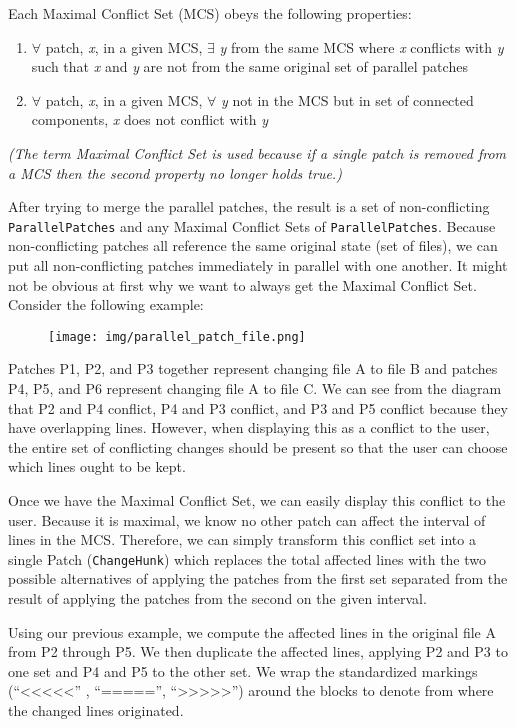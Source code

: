\documentclass[]{article}
\makeatletter
\def\maxwidth{\ifdim\Gin@nat@width>\linewidth\linewidth
\else\Gin@nat@width\fi}
\let\Oldincludegraphics\includegraphics
\renewcommand{\includegraphics}[1]{\Oldincludegraphics[width=\maxwidth]{#1}}
\makeatother
\begin{document}
Each Maximal Conflict Set (MCS) obeys the following properties: 
\begin{enumerate}[1.]
\item
$\forall$ patch, \emph{x}, in a given MCS, $\exists$ \emph{y} from the same
MCS where \emph{x} conflicts with \emph{y} such that \emph{x} and
\emph{y} are not from the same original set of parallel patches 
\item
$\forall$ patch, \emph{x}, in a given MCS, $\forall$ \emph{y} not in the MCS but in set
of connected components, \emph{x} does not conflict with \emph{y}
\end{enumerate}

\emph{(The term Maximal Conflict Set is used because if a single patch
is removed from a MCS then the second property no longer holds true.)}

After trying to merge the parallel patches, the result is a set of
non-conflicting \texttt{ParallelPatches} and any Maximal Conflict Sets
of \texttt{ParallelPatches}. Because non-conflicting patches all
reference the same original state (set of files), we can put all
non-conflicting patches immediately in parallel with one another. It
might not be obvious at first why we want to always get the Maximal
Conflict Set. Consider the following example:

\begin{figure}[Figure 5]
\centering
\texttt{[image: img/parallel\_patch\_file.png]}
\caption{}
\end{figure}

Patches P1, P2, and P3 together represent changing file A to file B and
patches P4, P5, and P6 represent changing file A to file C. We can see
from the diagram that P2 and P4 conflict, P4 and P3 conflict, and P3 and
P5 conflict because they have overlapping lines. However, when
displaying this as a conflict to the user, the entire set of conflicting
changes should be present so that the user can choose which lines ought
to be kept.

Once we have the Maximal Conflict Set, we can easily display this
conflict to the user. Because it is maximal, we know no other patch can
affect the interval of lines in the MCS. Therefore, we can simply
transform this conflict set into a single Patch (\texttt{ChangeHunk})
which replaces the total affected lines with the two possible
alternatives of applying the patches from the first set separated from
the result of applying the patches from the second on the given
interval.

Using our previous example, we compute the affected lines in the
original file A from P2 through P5. We then duplicate the affected
lines, applying P2 and P3 to one set and P4 and P5 to the other set. We
wrap the standardized markings
(``\textless{}\textless{}\textless{}\textless{}\textless{}'' ,
``====='',
``\textgreater{}\textgreater{}\textgreater{}\textgreater{}\textgreater{}'')
around the blocks to denote from where the changed lines originated.
\end{document}
